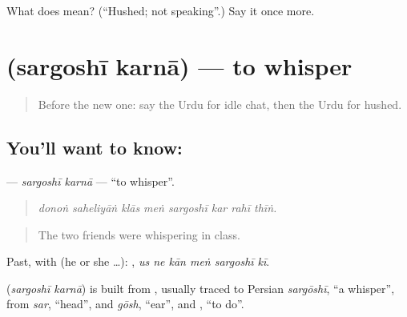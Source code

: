 \begin{tcolorbox}[breakable,colback=teal!4,colframe=teal!35!black,title={Before you move on}]
What does  mean? (\textquotedblleft{}Hushed; not speaking\textquotedblright{}.) Say it once more.
\end{tcolorbox}
\section[\texorpdfstring{\ur{سرگوشی} \ur{کرنا} (sargoshī karnā)}{سرگوشی کرنا (sargoshī karnā)}]{  (sargoshī karnā) — to whisper}

\label{lesson:UR-C463-sargoshi-karna}



\begin{quote}
Before the new one: say the Urdu for idle chat, then the Urdu for hushed.
\end{quote}

\subsection*{You'll want to know:  }
\textbf{ } — \emph{sargoshī karnā} — \textquotedblleft{}to whisper\textquotedblright{}.

\begin{quote}
       
\end{quote}

\begin{quote}
\emph{donoṅ saheliyāṅ klās meṅ sargoshī kar rahī thīṅ.}
\end{quote}

\begin{quote}
The two friends were whispering in class.
\end{quote}

Past, with  (he or she …):      , \emph{us ne kān meṅ sargoshī kī}.

\begin{cousinweb}
\textbf{ } (\emph{sargoshī karnā}) is built from \textbf{}, usually traced to Persian \emph{sargōshī}, \textquotedblleft{}a whisper\textquotedblright{}, from \emph{sar}, \textquotedblleft{}head\textquotedblright{}, and \emph{gōsh}, \textquotedblleft{}ear\textquotedblright{}, and \textbf{}, \textquotedblleft{}to do\textquotedblright{}.
\end{cousinweb}

